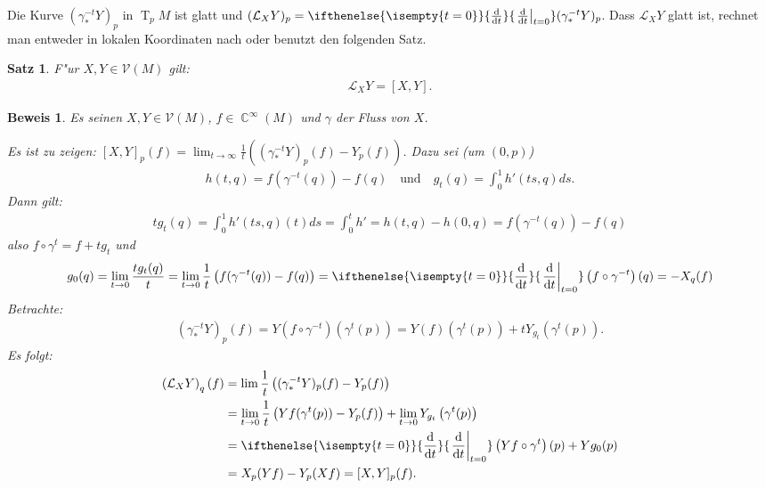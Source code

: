 \documentclass[paper=A4, twoside, chapterprefix=true, bibliography=totoc, headsepline]{scrbook}
\DeclareMathOperator{\C}{\mathbb{C}}
\DeclareMathOperator{\T}{T} %
\newcommand{\dop}{\mathrm{d}}
\newcommand{\difffrac}[3][]{\ifthenelse{\isempty{#1}}{\frac{\dop #2}{\dop #3}}{\left. \frac{\dop #2}{\dop #3} \right|_{#1}}}
\theoremstyle{plain}
\newtheorem{Satz}[Dfn]{Satz}
\newtheorem{Bem}[Dfn]{Bemerkung}
\theoremstyle{nonumberplain}
\newtheorem{bew}{Beweis}
\theoremstyle{empty}
\theoremstyle{break}
\begin{document}
Die Kurve $(\gamma_{*}^{-t}Y)_p$ in $\T_pM$ ist glatt und $(\mathcal L_XY)_p = \difffrac[t=0]{}{t}(\gamma_{*}^{-t}Y)_p$. Dass $\mathcal L_XY$ glatt ist, rechnet man entweder in lokalen Koordinaten nach oder benutzt den folgenden Satz.

\begin{Satz}
  F"ur $X,Y \in \mathcal V(M)$ gilt:
  \begin{align*}
    \mathcal L_XY = [X,Y].
  \end{align*}
\end{Satz}

\begin{bew}
Es seinen $X,Y \in \mathcal V(M)$, $f \in \C^{\infty}(M)$ und $\gamma$ der Fluss von $X$.

Es ist zu zeigen: $[X,Y]_p(f) = \lim_{t \to \infty} \frac{1}{t}\left((\gamma_{*}^{-t}Y)_p(f)-Y_p(f)\right)$.
Dazu sei (um $(0,p)$)
\begin{align*}
  h(t,q) = f(\gamma^{-t}(q))-f(q) \quad \text{und} \quad g_t(q) = \int_0^1 h'(ts,q)ds.
\end{align*}
Dann gilt:
\begin{align*}
  tg_t(q) = \int_0^1h'(ts,q)(t)ds = \int_0^th' = h(t,q) - h(0,q) = f(\gamma^{-t}(q)) - f(q)
\end{align*}
also $f \circ \gamma^t = f + tg_t$ und 
\begin{align*}
  g_0(q) = \lim_{t \to 0} \frac{tg_t(q)}{t} = \lim_{t \to 0}\frac{1}t\left(f(\gamma^{-t}(q))-f(q)\right) = \difffrac[t=0]{}{t}\left(f \circ \gamma^{-t}\right)(q) = -X_q(f)
\end{align*}
Betrachte:
\begin{align*}
  \left(\gamma_{*}^{-t}Y\right)_p(f) = Y\left(f \circ \gamma^{-t}\right)\left(\gamma^t(p)\right) = Y(f)\left(\gamma^t(p)\right) + tY_{g_t}\left(\gamma^t(p)\right).
\end{align*}
Es folgt:
\begin{align*}
  \left(\mathcal L_XY\right)_q(f) & = \lim \frac{1}t \left((\gamma_{*}^{-t}Y)_p(f) - Y_p(f)\right)\\
& = \lim_{t\to 0} \frac{1}t \left(Yf(\gamma^t(p))-Y_p(f)\right) + \lim_{t\to 0} Y_{g_t}\left(\gamma^t(p)\right)\\
& = \difffrac[t=0]{}{t}\left(Yf \circ \gamma^t\right)(p) + Yg_0(p)\\
& = X_p(Y f) - Y_p(Xf) = [X,Y]_p(f).
\end{align*} 
\end{bew}
\end{document}
